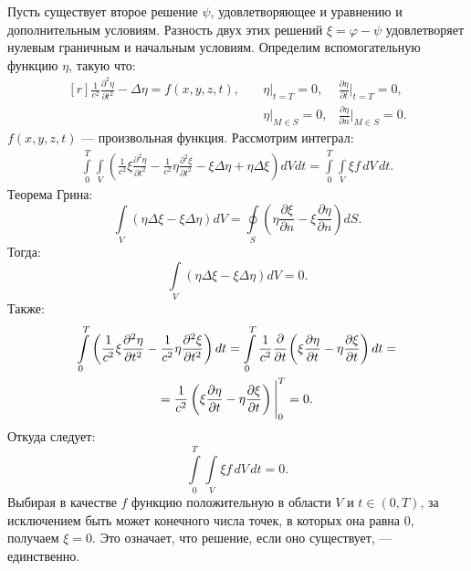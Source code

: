 \documentclass[a4paper,14pt]{extreport} %
\newcommand{\df}[1]{\cfrac{\partial}{\partial #1}}
\newcommand{\dff}[2]{\frac{\partial #1}{\partial #2}}
\newcommand{\dfs}[2]{\frac{\partial^2 #1}{\partial #2^2}}
\begin{document}
	Пусть существует второе решение $\psi$, удовлетворяющее и уравнению и дополнительным условиям. Разность двух этих решений $\xi = \varphi - \psi$ удовлетворяет нулевым граничным и начальным условиям. Определим вспомогательную функцию $\eta$, такую что:
	\begin{equation*}
		\begin{aligned}[r]
		\frac{1}{c^2}\dfs{\eta}{t} - \Delta \eta = f(x, y, z, t),
		\quad
			& \eta \Big|_{t = T} = 0, &  \dff{\eta}{t} \Big|_{t = T} = 0, \\
			& \eta \Big|_{M\in S} = 0, & \dff{\eta}{n} \Big|_{M\in S} = 0.
		\end{aligned}		
	\end{equation*}
	$f(x,y,z,t)$ --- произвольная функция. Рассмотрим интеграл:
	\begin{equation*}
		\begin{gathered}
			\int\limits_0^T\int\limits_{V} \left(\frac{1}{c^2} \xi \dfs{\eta}{t} - \frac{1}{c^2}\eta \dfs{\xi}{t} - \xi \Delta \eta + \eta \Delta \xi \right) dV dt = \int\limits_0^T\int\limits_{V} \xi f\, dV\,dt.
		\end{gathered}
	\end{equation*}
	Теорема Грина:
	\begin{equation*}
		\int\limits_V (\eta \Delta \xi - \xi \Delta \eta) dV = \oint\limits_S \left(\eta \dff{\xi}{n} - \xi \dff{\eta}{n} \right) dS.
	\end{equation*}
	Тогда:
	\begin{equation*}
		\int\limits_V (\eta \Delta \xi - \xi \Delta \eta) dV = 0.
	\end{equation*}
	Также:
	\begin{equation*}
		\begin{gathered}
			\int\limits_0^T 
			\left(\frac{1}{c^2} \xi \dfs{\eta}{t} - \frac{1}{c^2}\eta \dfs{\xi}{t} \right) dt =
			\int\limits_0^T 
			\frac{1}{c^2} \df{t} \left(\xi \dff{\eta}{t} - \eta \dff{\xi}{t} \right) dt	= \\ =
			\frac{1}{c^2} \left(\xi \dff{\eta}{t} - \eta \dff{\xi}{t} \right) \Bigg|_0^T = 0.
		\end{gathered}
	\end{equation*}
	Откуда следует:
	\begin{equation*} 
		\int\limits_0^T\int\limits_{V} \xi f\, dV\,dt = 0.
	\end{equation*}
	Выбирая в качестве $f$ функцию положительную в области $V$ и $t\in(0, T)$, за исключением быть может конечного числа точек, в которых она равна 0, получаем $\xi = 0$. Это означает, что решение, если оно существует, --- единственно.
	
\end{document}
